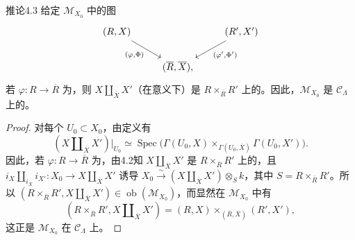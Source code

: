 \begin{SGAresult}{推论}{4.3}
给定 $\mathcal M_{X_0}$ 中的图
\[
\begin{tikzcd}
(R,X)\arrow[dr,"{(\varphi,\Phi)}"']&&(R',X')\arrow[dl,"{(\varphi',\Phi')}"]\\
&(\overline R,\overline X),&
\end{tikzcd}
\]
若 $\varphi:R\to\overline R$ 为，则 $X\amalg_{\overline X}X'$（在意义下）是 $R\times_{\overline R}R'$ 上的。因此，$\mathcal M_{X_0}$ 是 $\mathcal C_\Lambda$ 上的。
\end{SGAresult}
\begin{proof}
对每个 $U_0\subset X_0$，由定义有
\[
(X\amalg_{\overline X}X')|_{U_0}\simeq
\operatorname{Spec}\bigl(\Gamma(U_0,X)\times_{\Gamma(U_0,\overline X)}\Gamma(U_0,X')\bigr).
\]
因此，若 $\varphi:R\to\overline R$ 为，由4.2知 $X\amalg_{\overline X}X'$ 是 $R\times_{\overline R}R'$ 上的，且 $i_X\amalg_{i_{\overline X}}i_{X'}:X_0\to X\amalg_{\overline X}X'$ 诱导 $X_0\xrightarrow\sim(X\amalg_{\overline X}X')\otimes_S k$，其中 $S=R\times_{\overline R}R'$。所以 $(R\times_{\overline R}R',X\amalg_{\overline X}X')\in\operatorname{ob}(\mathcal M_{X_0})$，而显然在 $\mathcal M_{X_0}$ 中有
\[
(R\times_{\overline R}R',X\amalg_{\overline X}X')
=(R,X)\times_{(\overline R,\overline X)}(R',X'),
\]
这正是 $\mathcal M_{X_0}$ 在 $\mathcal C_\Lambda$ 上。
\end{proof}

